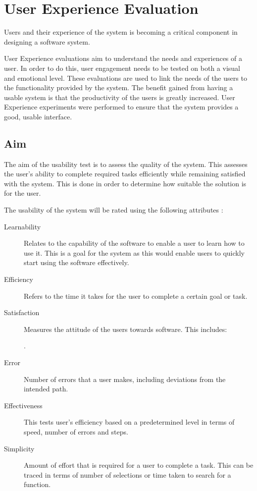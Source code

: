 \documentclass[12pt,a4paper]{report}
\begin{document}
\section{User Experience Evaluation}
Users and their experience of the system is becoming a critical component
in designing a software system\cite{Forlizzi:2004:UEI:1013115.1013152}.

User Experience evaluations aim to understand the needs and experiences of a user.
In order to do this, user engagement needs to be tested on both a visual and emotional level.
These evaluations are used to link the needs of the users to the functionality provided by the
system. The benefit gained from having a usable system is that the productivity
of the users is greatly increased\cite{nielsen2003usability}.
User Experience experiments were performed to ensure that the system
provides a good, usable interface.

\subsection{Aim}
The aim of the usability test is to assess the quality of the system. This
assesses the user's ability to complete required tasks efficiently while
remaining satisfied with the system\cite{bevan1995measuring}. This is done in
order to determine how suitable the solution is for the user.

The usability of the system will be rated using the following attributes
\cite{doi:10.1207/s15327590ijhc1803_3}:
\begin{description}
\item[Learnability] Relates to the capability of the software to enable a user
    to learn how to use it. This is a goal for the system as this would
    enable users to quickly start using the software effectively.
\item[Efficiency] Refers to the time it takes for the
    user to complete a certain goal or task.
\item[Satisfaction] Measures the attitude of the users towards software. This
    includes: .

\item[Error] Number of errors that a user makes, including deviations from
    the intended path.
\item[Effectiveness] This tests user's efficiency based on a predetermined level
    in terms of speed, number of errors and steps.
\item[Simplicity] Amount of effort that is required for a user to complete a
    task. This can be traced in terms of number of selections or time taken to
    search for a function.
\end{description}
\end{document}
